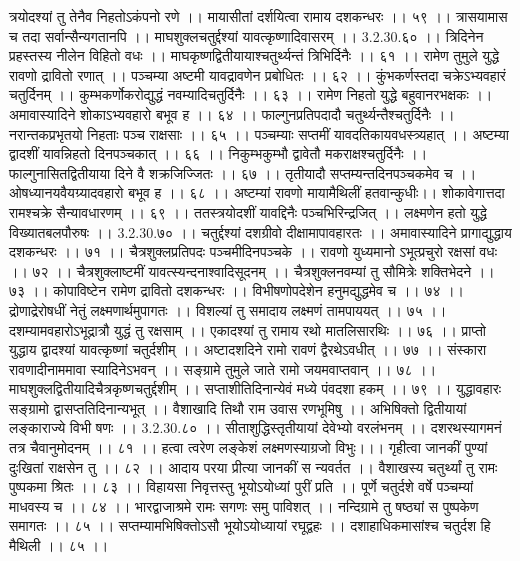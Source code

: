 त्रयोदश्यां तु तेनैव निहतोऽकंपनो रणे ।।
मायासीतां दर्शयित्वा रामाय दशकन्धरः ।। ५९ ।।
त्रासयामास च तदा सर्वान्सैन्यगतानपि ।।
माघशुक्लचतुर्द्दश्यां यावत्कृष्णादिवासरम् ।। 3.2.30.६० ।।
त्रिदिनेन प्रहस्तस्य नीलेन विहितो वधः ।।
माघकृष्णद्वितीयायाश्चतुर्थ्यन्तं त्रिभिर्दिनैः ।। ६१ ।।
रामेण तुमुले युद्धे रावणो द्रावितो रणात् ।।
पञ्चम्या अष्टमी यावद्रावणेन प्रबोधितः ।। ६२ ।।
कुंभकर्णस्तदा चक्रेऽभ्यवहारं चतुर्दिनम् ।।
कुम्भकर्णोकरोद्युद्धं नवम्यादिचतुर्दिनैः ।। ६३ ।।
रामेण निहतो युद्धे बहुवानरभक्षकः ।।
अमावास्यादिने शोकाऽभ्यवहारो बभूव ह ।। ६४ ।।
फाल्गुनप्रतिपदादौ चतुर्थ्यन्तैश्चतुर्दिनैः ।।
नरान्तकप्रभृतयो निहताः पञ्च राक्षसाः ।। ६५ ।।
पञ्चम्याः सप्तमीं यावदतिकायवधस्त्र्यहात् ।।
अष्टम्या द्वादशीं यावन्निहतो दिनपञ्चकात् ।। ६६ ।।
निकुम्भकुम्भौ द्वावेतौ मकराक्षश्चतुर्दिनैः ।।
फाल्गुनासितद्वितीयाया दिने वै शक्रजिज्जितः ।। ६७ ।।
तृतीयादौ सप्तम्यन्तदिनपञ्चकमेव च ।।
ओषध्यानयवैयग्र्यादवहारो बभूव ह ।। ६८ ।।
अष्टम्यां रावणो मायामैथिलीं हतवान्कुधीः।।
शोकावेगात्तदा रामश्चक्रे सैन्यावधारणम् ।। ६९ ।।
ततस्त्रयोदशीं यावद्दिनैः पञ्चभिरिन्द्रजित् ।।
लक्ष्मणेन हतो युद्धे विख्यातबलपौरुषः ।। 3.2.30.७० ।।
चतुर्द्दश्यां दशग्रीवो दीक्षामापावहारतः ।।
अमावास्यादिने प्रागाद्युद्धाय दशकन्धरः ।। ७१ ।।
चैत्रशुक्लप्रतिपदः पञ्चमीदिनपञ्चके ।।
रावणो युध्यमानो ऽभूत्प्रचुरो रक्षसां वधः ।। ७२ ।।
चैत्रशुक्लाष्टमीं यावत्स्यन्दनाश्वादिसूदनम् ।।
चैत्रशुक्लनवम्यां तु सौमित्रेः शक्तिभेदने ।। ७३ ।।
कोपाविष्टेन रामेण द्रावितो दशकन्धरः ।।
विभीषणोपदेशेन हनुमद्युद्धमेव च ।। ७४ ।।
द्रोणाद्रेरोषधीं नेतुं लक्ष्मणार्थमुपागतः ।।
विशल्यां तु समादाय लक्ष्मणं तामपाययत् ।। ७५ ।।
दशम्यामवहारोऽभूद्रात्रौ युद्धं तु रक्षसाम् ।।
एकादश्यां तु रामाय रथो मातलिसारथिः ।। ७६ ।।
प्राप्तो युद्धाय द्वादश्यां यावत्कृष्णां चतुर्दशीम् ।।
अष्टादशदिने रामो रावणं द्वैरथेऽवधीत् ।। ७७ ।।
संस्कारा रावणादीनाममावा स्यादिनेऽभवन् ।।
सङ्ग्रामे तुमुले जाते रामो जयमवाप्तवान् ।। ७८ ।।
माघशुक्लद्वितीयादिचैत्रकृष्णचतुर्द्दशीम् ।।
सप्ताशीतिदिनान्येवं मध्ये पंवदशा हकम् ।। ७९ ।।
युद्धावहारः सङ्ग्रामो द्वासप्ततिदिनान्यभूत् ।।
वैशाखादि तिथौ राम उवास रणभूमिषु ।।
अभिषिक्तो द्वितीयायां लङ्काराज्ये विभी षणः ।। 3.2.30.८० ।।
सीताशुद्धिस्तृतीयायां देवेभ्यो वरलंभनम् ।।
दशरथस्यागमनं तत्र चैवानुमोदनम् ।। ८१ ।।
हत्वा त्वरेण लङ्केशं लक्ष्मणस्याग्रजो विभुः।।।
गृहीत्वा जानकीं पुण्यां दुःखितां राक्षसेन तु ।। ८२ ।।
आदाय परया प्रीत्या जानकीं स न्यवर्तत ।।
वैशाखस्य चतुर्थ्यां तु रामः पुष्पकमा श्रितः ।। ८३ ।।
विहायसा निवृत्तस्तु भूयोऽयोध्यां पुरीं प्रति ।।
पूर्णे चतुर्दशे वर्षे पञ्चम्यां माधवस्य च ।। ८४ ।।
भारद्वाजाश्रमे रामः सगणः समु पाविशत् ।।
नन्दिग्रामे तु षष्ठ्यां स पुष्पकेण समागतः ।। ८५ ।।
सप्तम्यामभिषिक्तोऽसौ भूयोऽयोध्यायां रघूद्वहः ।।
दशाहाधिकमासांश्च चतुर्दश हि मैथिली ।। ८५ ।।

